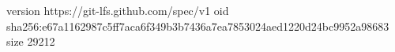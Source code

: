 version https://git-lfs.github.com/spec/v1
oid sha256:e67a1162987c5ff7aca6f349b3b7436a7ea7853024aed1220d24bc9952a98683
size 29212
